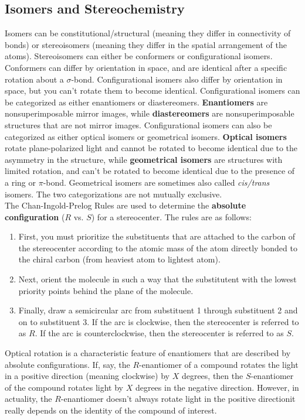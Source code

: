 \documentclass{article}
\theoremstyle{plain}%
\theoremstyle{definition}
\theoremstyle{remark}
\begin{document}
\subsection{Isomers and Stereochemistry}
Isomers can be constitutional/structural (meaning they differ in connectivity of bonds) or stereoisomers (meaning they differ in the spatial arrangement of the atoms). Stereoisomers can either be conformers or configurational isomers. Conformers can differ by orientation in space, and are identical after a specific rotation about a $\sigma$-bond. Configurational isomers also differ by orientation in space, but you can't rotate them to become identical. Configurational isomers can be categorized as either enantiomers or diastereomers. \textbf{Enantiomers} are nonsuperimposable mirror images, while \textbf{diastereomers} are nonsuperimposable structures that are not mirror images. Configurational isomers can also be categorized as either optical isomers or geometrical isomers. \textbf{Optical isomers} rotate plane-polarized light and cannot be rotated to become identical due to the asymmetry in the structure, while \textbf{geometrical isomers} are structures with limited rotation, and can't be rotated to become identical due to the presence of a ring or $\pi$-bond. Geometrical isomers are sometimes also called \textit{cis/trans} isomers. The two categorizations are not mutually exclusive. \\
\indent The Chan-Ingold-Prelog Rules are used to determine the \textbf{absolute configuration} ($R$ vs. $S$) for a stereocenter. The rules are as follows:
\begin{enumerate}
	\item First, you must prioritize the substituents that are attached to the carbon of the stereocenter according to the atomic mass of the atom directly bonded to the chiral carbon (from heaviest atom to lightest atom).
	\item Next, orient the molecule in such a way that the substitutent with the lowest priority points behind the plane of the molecule.
	\item Finally, draw a semicircular arc from substituent 1 through substituent 2 and on to substituent 3. If the arc is clockwise, then the stereocenter is referred to as $R$. If the arc is counterclockwise, then the stereocenter is referred to as $S$. 
\end{enumerate}
\noindent Optical rotation is a characteristic feature of enantiomers that are described by absolute configurations. If, say, the $R$-enantiomer of a compound rotates the light in a positive direction (meaning clockwise) by $X$ degrees, then the $S$-enantiomer of the compound rotates light by $X$ degrees in the negative direction. However, in actuality, the $R$-enantiomer doesn't always rotate light in the positive direction\textemdash it really depends on the identity of the compound of interest.\\
\end{document}
